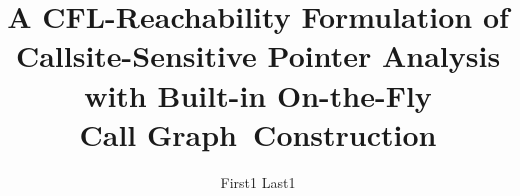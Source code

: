 \documentclass[sigplan,10pt,review,anonymous]{acmart}
\begin{document}

\title[CFL-Reachability with On-the-Fly Call Graph Construction]{  A CFL-Reachability Formulation of Callsite-Sensitive 
 Pointer  Analysis with Built-in On-the-Fly\\ Call Graph~Construction } 



\author{First1 Last1}
\end{document}
